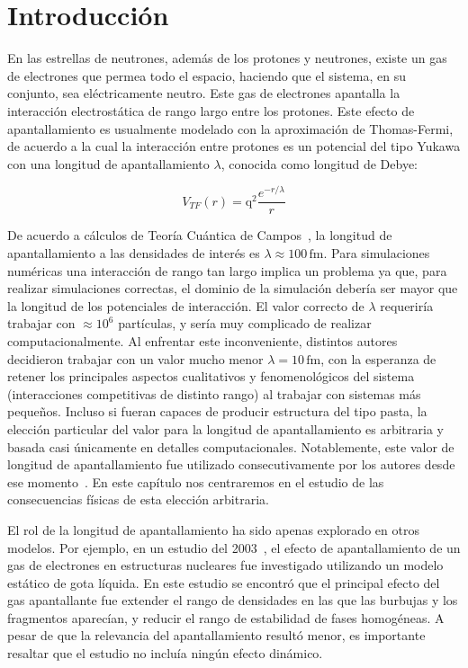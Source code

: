 \section{Introducción}

En las estrellas de neutrones, además de los protones y neutrones, existe un gas de electrones que permea todo el espacio, haciendo que el sistema, en su conjunto, sea eléctricamente neutro.
Este gas de electrones apantalla la interacción electrostática de rango largo entre los protones.
Este efecto de apantallamiento es usualmente modelado con la aproximación de Thomas-Fermi, de acuerdo a la cual la interacción entre protones es un potencial del tipo Yukawa con una longitud de apantallamiento $\lambda$, conocida como longitud de Debye:

\begin{equation*}
 V_{TF}(r) = \text{q}^2\frac{e^{-r/\lambda}}{r}
\end{equation*}

De acuerdo a cálculos de Teoría Cuántica de Campos~\cite[pp. 175-180]{fetter_quantum_2003}, la longitud de apantallamiento a las densidades de interés es $\lambda\approx100\,\text{fm}$. 
Para simulaciones numéricas una interacción de rango tan largo implica un problema ya que, para realizar simulaciones correctas, el dominio de la simulación debería ser mayor que la longitud de los potenciales de interacción.
El valor correcto de $\lambda$ requeriría trabajar con $\approx 10^6$ partículas, y sería muy complicado de realizar computacionalmente.
Al enfrentar este inconveniente, distintos autores~\cite{maruyama_molecular_2012, horowitz_neutrino-pasta_2004} decidieron trabajar con un valor mucho menor $\lambda=10\,\text{fm}$, con la esperanza de retener los principales aspectos cualitativos y fenomenológicos del sistema (interacciones competitivas de distinto rango) al trabajar con sistemas más pequeños.
Incluso si fueran capaces de producir estructura del tipo pasta, la elección particular del valor para la longitud de apantallamiento es arbitraria y basada casi únicamente en detalles computacionales.
Notablemente, este valor de longitud de apantallamiento fue utilizado
consecutivamente por los autores desde ese momento~\cite{maruyama_quantum_1998, horowitz_neutrino-pasta_2004, dorso_topological_2012}.
En este capítulo nos centraremos en el estudio de las consecuencias físicas de esta elección arbitraria.

El rol de la longitud de apantallamiento ha sido apenas explorado en otros modelos.
Por ejemplo, en un estudio del 2003~\cite{watanabe_electron_2003}, el efecto de apantallamiento de un gas de electrones en estructuras nucleares fue investigado utilizando un modelo estático de gota líquida.
En este estudio se encontró que el principal efecto del gas apantallante fue extender el rango de densidades en las que las burbujas y los fragmentos aparecían, y reducir el rango de estabilidad de fases homogéneas.
A pesar de que la relevancia del apantallamiento resultó menor, es importante resaltar que el estudio no incluía ningún efecto dinámico.

